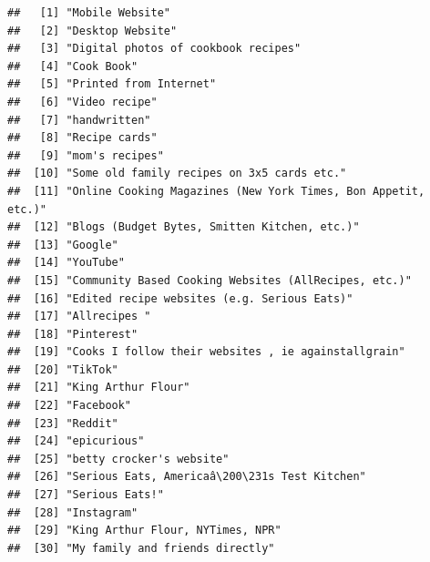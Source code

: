 \documentclass[
]{article}
\begin{document}
\begin{verbatim}
##   [1] "Mobile Website"                                                           
##   [2] "Desktop Website"                                                          
##   [3] "Digital photos of cookbook recipes"                                       
##   [4] "Cook Book"                                                                
##   [5] "Printed from Internet"                                                    
##   [6] "Video recipe"                                                             
##   [7] "handwritten"                                                              
##   [8] "Recipe cards"                                                             
##   [9] "mom's recipes"                                                            
##  [10] "Some old family recipes on 3x5 cards etc."                                
##  [11] "Online Cooking Magazines (New York Times, Bon Appetit, etc.)"             
##  [12] "Blogs (Budget Bytes, Smitten Kitchen, etc.)"                              
##  [13] "Google"                                                                   
##  [14] "YouTube"                                                                  
##  [15] "Community Based Cooking Websites (AllRecipes, etc.)"                      
##  [16] "Edited recipe websites (e.g. Serious Eats)"                               
##  [17] "Allrecipes "                                                              
##  [18] "Pinterest"                                                                
##  [19] "Cooks I follow their websites , ie againstallgrain"                       
##  [20] "TikTok"                                                                   
##  [21] "King Arthur Flour"                                                        
##  [22] "Facebook"                                                                 
##  [23] "Reddit"                                                                   
##  [24] "epicurious"                                                               
##  [25] "betty crocker's website"                                                  
##  [26] "Serious Eats, Americaâ\200\231s Test Kitchen"                                   
##  [27] "Serious Eats!"                                                            
##  [28] "Instagram"                                                                
##  [29] "King Arthur Flour, NYTimes, NPR"                                          
##  [30] "My family and friends directly"                                           

\end{verbatim}
\end{document}
